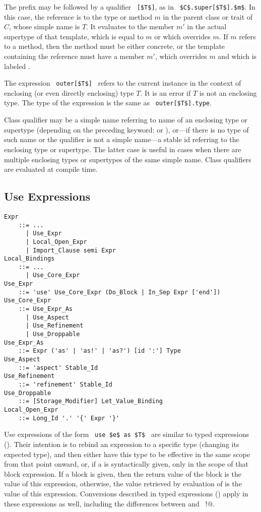 The  prefix may be followed by a qualifier ~\lstinline![$T$]!, as in ~\lstinline!$C$.super[$T$].$m$!. In this case, the reference is to the type or method $m$ in the parent class or trait of $C$, whose simple name is $T$. It evaluates to the member $m'$ in the actual supertype of that template, which is equal to $m$ or which overrides $m$. If $m$ refers to a method, then the method must be either concrete, or the template containing the reference must have a member $m'$, which overrides $m$ and which is labeled . 

The expression ~\lstinline!outer[$T$]!~ refers to the current instance in the context of enclosing (or even directly enclosing) type $T$. It is an error if $T$ is not an enclosing type. The type of the expression is the same as ~\lstinline!outer[$T$].type!. 

Class qualifier may be a simple name referring to name of an enclosing type or supertype (depending on the preceding keyword:  or ), or---if there is no type of such name or the qualifier is not a simple name---a stable id referring to the enclosing type or supertype. The latter case is useful in cases when there are multiple enclosing types or supertypes of the same simple name. Class qualifiers are evaluated at compile time. 




\subsection{Use Expressions}
\label{sec:use-expressions}

\grammar\begin{lstlisting}
Expr
    ::= ...
      | Use_Expr
      | Local_Open_Expr
      | Import_Clause semi Expr
Local_Bindings
    ::= ...
      | Use_Core_Expr
Use_Expr 
    ::= 'use' Use_Core_Expr (Do_Block | In_Sep Expr ['end'])
Use_Core_Expr
    ::= Use_Expr_As
      | Use_Aspect
      | Use_Refinement
      | Use_Droppable
Use_Expr_As 
    ::= Expr ('as' | 'as!' | 'as?') [id ':'] Type
Use_Aspect
    ::= 'aspect' Stable_Id
Use_Refinement 
    ::= 'refinement' Stable_Id
Use_Droppable 
    ::= [Storage_Modifier] Let_Value_Binding
Local_Open_Expr
    ::= Long_Id '.' '{' Expr '}'
\end{lstlisting}

Use expressions of the form ~\lstinline!use $e$ as $T$!~ are similar to typed expressions (). Their intention is to rebind an expression to a specific type (changing its expected type), and then either have this type to be effective in the same scope from that point onward, or, if a  is syntactically given, only in the scope of that block expression. If a block is given, then the return value of the block is the value of this expression, otherwise, the value retrieved by evaluation of  is the value of this expression. Conversions described in typed expressions () apply in these expressions as well, including the differences between  and ~\lstinline@as!@. 


